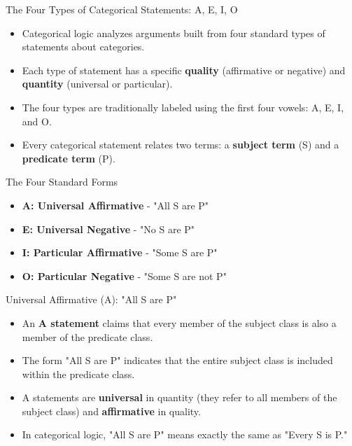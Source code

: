 \documentclass{beamer}
\begin{document}
	\begin{frame}{The Four Types of Categorical Statements: A, E, I, O}
		\begin{itemize}
			\item Categorical logic analyzes arguments built from four standard types of statements about categories.
			\item Each type of statement has a specific \textbf{quality} (affirmative or negative) and \textbf{quantity} (universal or particular).
			\item The four types are traditionally labeled using the first four vowels: A, E, I, and O.
			\item Every categorical statement relates two terms: a \textbf{subject term} (S) and a \textbf{predicate term} (P).
		\end{itemize}
		
		\begin{block}{The Four Standard Forms}
			\begin{itemize}
				\item \textbf{A: Universal Affirmative} - "All S are P"
				\item \textbf{E: Universal Negative} - "No S are P"
				\item \textbf{I: Particular Affirmative} - "Some S are P"
				\item \textbf{O: Particular Negative} - "Some S are not P"
			\end{itemize}
		\end{block}
	\end{frame}
	
	\begin{frame}{Universal Affirmative (A): "All S are P"}
		\begin{itemize}
			\item An \textbf{A statement} claims that every member of the subject class is also a member of the predicate class.
			\item The form "All S are P" indicates that the entire subject class is included within the predicate class.
			\item A statements are \textbf{universal} in quantity (they refer to all members of the subject class) and \textbf{affirmative} in quality.
			\item In categorical logic, "All S are P" means exactly the same as "Every S is P."
		\end{itemize}
		
		\begin{center}
		\end{center}
	\end{frame}
	
\end{document}
